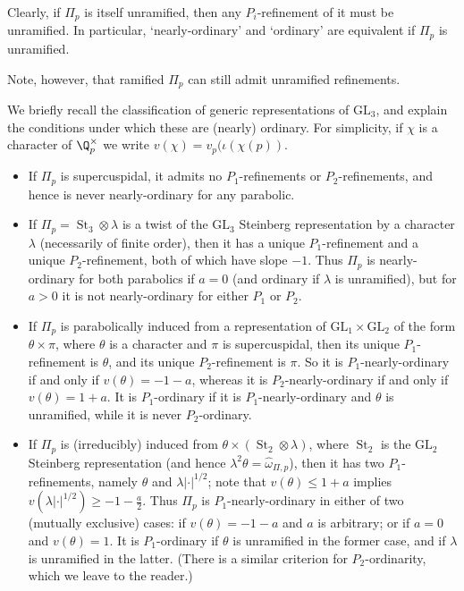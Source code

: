 \documentclass[10pt,reqno,a4paper]{amsart}
\newcommand{\GL}{\mathrm{GL}}
\begin{document}
 \begin{remark}
  Clearly, if $\Pi_p$ is itself unramified, then any $P_i$-refinement of it must be unramified. In particular, `nearly-ordinary' and `ordinary' are equivalent if $\Pi_p$ is unramified. 
  
  Note, however, that ramified $\Pi_p$ can still admit unramified refinements.
 \end{remark}


 \begin{example}
  \label{ex:langlands}
  We briefly recall the classification of generic representations of $\GL_3$, and explain the conditions under which these are (nearly) ordinary. For simplicity, if $\chi$ is a character of $\Q_p^\times$ we write $v(\chi) = v_p(\iota(\chi(p))$.
  \begin{itemize}
  	\item If $\Pi_p$ is supercuspidal, it admits no $P_1$-refinements or $P_2$-refinements, and hence is never nearly-ordinary for any parabolic.

  	\item If $\Pi_p = \operatorname{St}_3 \otimes \lambda$ is a twist of the $\GL_3$ Steinberg representation by a character $\lambda$ (necessarily of finite order), then it has a unique $P_1$-refinement and a unique $P_2$-refinement, both of which have slope $-1$. Thus $\Pi_p$ is nearly-ordinary for both parabolics if $a = 0$ (and ordinary if $\lambda$ is unramified), but for $a > 0$ it is not nearly-ordinary for either $P_1$ or $P_2$.

  	\item If $\Pi_p$ is parabolically induced from a representation of $\GL_1 \times \GL_2$ of the form $\theta \times \pi$, where $\theta$ is a character and $\pi$ is supercuspidal, then its unique $P_1$-refinement is $\theta$, and its unique $P_2$-refinement is $\pi$. So it is $P_1$-nearly-ordinary if and only if $v(\theta) = -1-a$, whereas it is $P_2$-nearly-ordinary if and only if $v(\theta) = 1+a$. It is $P_1$-ordinary if it is $P_1$-nearly-ordinary and $\theta$ is unramified, while it is never $P_2$-ordinary.

  	\item If $\Pi_p$ is (irreducibly) induced from $\theta \times (\operatorname{St}_2 \otimes \lambda)$, where $\operatorname{St}_2$ is the $\GL_2$ Steinberg representation (and hence $\lambda^2 \theta = \hat\omega_{\Pi, p}$), then it has two $P_1$-refinements, namely $\theta$ and $\lambda |\cdot|^{1/2}$; note that $v(\theta) \le 1 + a$ implies $v(\lambda |\cdot|^{1/2}) \ge -1-\tfrac{a}{2}$. Thus $\Pi_p$ is $P_1$-nearly-ordinary in either of two (mutually exclusive) cases: if $v(\theta) = -1-a$ and $a$ is arbitrary; or if $a = 0$ and $v(\theta) = 1$. It is $P_1$-ordinary if $\theta$ is unramified in the former case, and if $\lambda$ is unramified in the latter. (There is a similar criterion for $P_2$-ordinarity, which we leave to the reader.)


\end{itemize}
\end{example}
\end{document}
